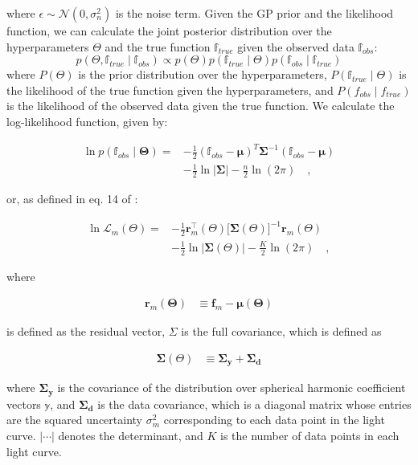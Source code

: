 \documentclass[twocolumn]{aastex631}
\begin{document}
where $\epsilon \sim \mathcal{N}(0, \sigma_n^2)$ is the noise term. Given the GP prior and the likelihood function, we can 
calculate the joint posterior distribution over the hyperparameters $\Theta$ and the true function $\mathbb{f}_{true}$ given the observed data $\mathbb{f}_{obs}$:
%
\begin{equation}
    p(\Theta, \mathbb{f}_{true} \mid \mathbb{f}_{obs}) \propto p(\Theta) p(\mathbb{f}_{true} \mid \Theta) p(\mathbb{f}_{obs} \mid \mathbb{f}_{true})
\end{equation}
%
where $P(\Theta)$ is the prior distribution over the hyperparameters, $P(\mathbb{f}_{true} \mid \Theta)$ is the likelihood of the true function given 
the hyperparameters, and $P(f_{obs} \mid f_{true})$ is the likelihood of the observed data given the true function.
We calculate the log-likelihood function, given by:
%
\begin{linenomath}\begin{align}
    \label{eq:log-likeSabina}
    \ln p(\mathbb{f}_{obs} \mid \pmb{\Theta}) 
    =
    & -\frac{1}{2} (\mathbb{f}_{obs} - \pmb{\mu})^T \pmb{\Sigma}^{-1} (\mathbb{f}_{obs} - \pmb{\mu}) 
    \nonumber       \\[0.75em]
    & -
    \frac{1}{2} \ln |\pmb{\Sigma}| - \frac{n}{2} \ln (2\pi)
    \quad,
\end{align}\end{linenomath}
%
or, as defined in eq. 14 of \citep{Luger2021b}:
%
\begin{linenomath}\begin{align}
    \label{eq:log-likeRodrigo}
    \ln \mathcal{L}_m\left(\Theta\right)
    =
     & -\frac{1}{2}
    \mathbf{r}_m^\top\left(\Theta\right)
    \big[
        \pmb{\Sigma}\left(\Theta\right)
        \big]^{-1}
    \mathbf{r}_m\left(\Theta\right)
    \nonumber       \\[0.75em]
     & -
    \frac{1}{2}
    \ln \Big|
    \pmb{\Sigma}\left(\Theta\right)
    \Big|
    -
    \frac{K}{2}
    \ln \left( 2 \pi \right)
    \quad,
\end{align}\end{linenomath}
%
where
%
\begin{linenomath}\begin{align}
        \mathbf{r}_m\left(\pmb{\Theta}\right)
         & \equiv
        \mathbf{f}_m - \pmb{\mu}\left(\pmb{\Theta}\right)
    \end{align}\end{linenomath}
%
is defined as the residual vector,
%
$\Sigma$ is the full covariance, which is defined as 
%
\begin{linenomath}\begin{align}
    \pmb{\Sigma}\left(\Theta\right)
     & \equiv
    \pmb{\Sigma_y} + \pmb{\Sigma_d}
\end{align}\end{linenomath}
%
where $\pmb{\Sigma_y}$ is the covariance of the distribution over spherical harmonic coefficient
vectors $\mathbb{y}$, and $\pmb{\Sigma_d}$ is the data covariance, which is a diagonal
matrix whose entries are the squared uncertainty $\sigma_m^2$ corresponding to each data point in the light curve.
$| \cdots |$ denotes the determinant, and $K$ is the number of data points in
each light curve.%
\end{document}
